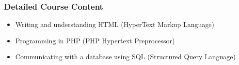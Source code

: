 \documentclass[dvipsnames]{beamer}
\begin{document}




\begin{frame}
\frametitle{Detailed Course Content}

\begin{itemize}
\item Writing and understanding HTML (HyperText Markup Language)
\item Programming in PHP (PHP Hypertext Preprocessor)
\item Communicating with a database using SQL (Structured Query Language)
\end{itemize}
\end{frame}
\end{document}

